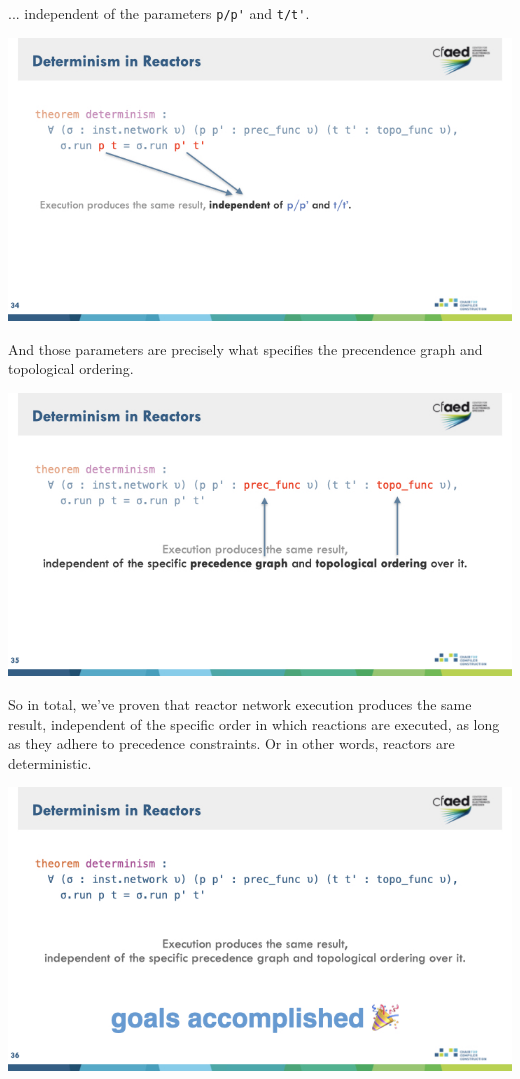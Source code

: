\documentclass{article}
\begin{document}
... independent of the parameters \verb|p/p'| and \verb|t/t'|.

\begin{center}
    \includegraphics[width=\columnwidth]{Slides/Slide 34.jpeg}
\end{center}

And those parameters are precisely what specifies the precendence graph and topological ordering.

\begin{center}
    \includegraphics[width=\columnwidth]{Slides/Slide 35.jpeg}
\end{center}

So in total, we've proven that reactor network execution produces the same result, independent of the specific order in which reactions are executed, as long as they adhere to precedence constraints.
Or in other words, reactors are deterministic. 

\begin{center}
    \includegraphics[width=\columnwidth]{Slides/Slide 36.jpeg}
\end{center}
\end{document}
